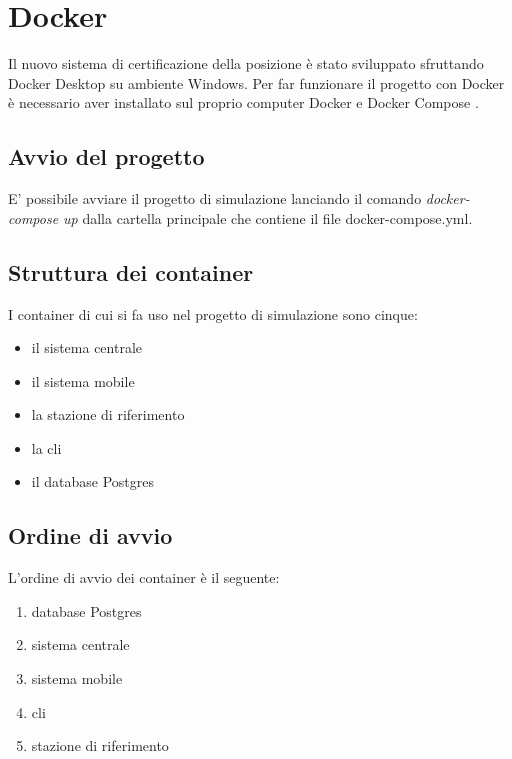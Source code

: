 \section{Docker}
Il nuovo sistema di certificazione della posizione è stato sviluppato sfruttando Docker Desktop su ambiente Windows. Per far funzionare il progetto con Docker è necessario aver installato sul proprio computer Docker e Docker Compose \cite{dockerinstall}.

\subsection{Avvio del progetto}
E' possibile avviare il progetto di simulazione lanciando il comando \textit{docker-compose up} dalla cartella principale che contiene il file docker-compose.yml.

\subsection{Struttura dei container}
I container di cui si fa uso nel progetto di simulazione sono cinque: 
\begin{itemize}
    \item il sistema centrale
    \item il sistema mobile
    \item la stazione di riferimento
    \item la cli
    \item il database Postgres
\end{itemize}

\subsection{Ordine di avvio}
L'ordine di avvio dei container è il seguente:
\begin{enumerate}
    \item database Postgres
    \item sistema centrale
    \item sistema mobile
    \item cli
    \item stazione di riferimento
\end{enumerate}

